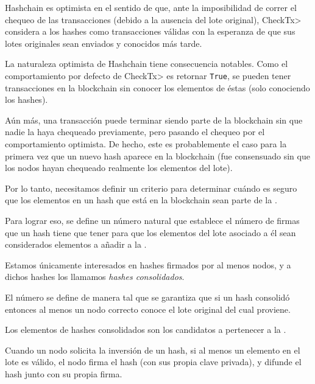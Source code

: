 %
Hashchain es optimista en el sentido de que, ante la imposibilidad de correr el chequeo
de las transacciones (debido a la ausencia del lote original), \<CheckTx> considera a los
hashes como transacciones válidas con la esperanza de que sus lotes originales sean enviados
y conocidos más tarde. 

%
La naturaleza optimista de Hashchain tiene consecuencia notables.
%
Como el comportamiento por defecto de  \<CheckTx> es retornar \texttt{True},
se pueden tener transacciones en la blockchain sin conocer los elementos de éstas
(solo conociendo los hashes).

%
Aún más, una transacción puede terminar siendo parte de la blockchain sin que nadie
la haya chequeado previamente, pero pasando el chequeo por el comportamiento optimista.
%
De hecho, este es probablemente el caso para la primera vez que un nuevo hash aparece
en la blockchain (fue consensuado sin que los nodos hayan chequeado realmente los elementos
del lote).

%

Por lo tanto, necesitamos definir un criterio para determinar cuándo es seguro
que los elementos en un hash que está en la blockchain sean parte de la \setchain.

%
Para lograr eso, se define un número natural \SPH que establece
el número de firmas que un hash tiene que tener para que los elementos del lote asociado a él
sean considerados elementos a añadir a la \setchain.

%
Estamos únicamente interesados en hashes firmados por al menos \SPH
nodos, y a dichos hashes los llamamos \textit{hashes consolidados}.

El número \SPH se define de manera tal que se garantiza que si un hash
consolidó entonces al menos un nodo correcto conoce el lote original del cual proviene.

%
Los elementos de hashes consolidados son los candidatos a pertenecer a la \setchain.

%
Cuando un nodo solicita la inversión de un hash, si al menos un elemento en el lote
es válido, el nodo firma el hash (con sus propia clave privada), y difunde el hash junto
con su propia firma.

